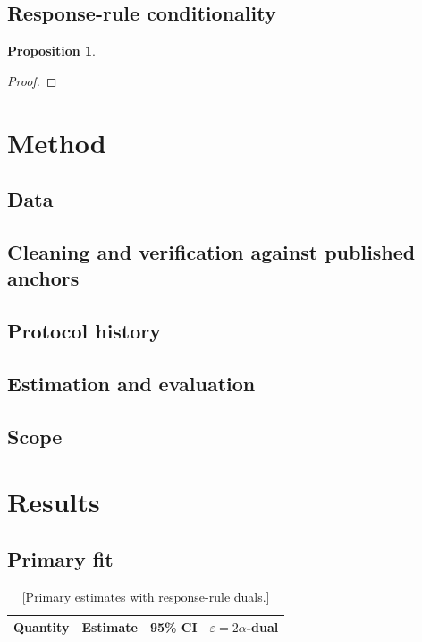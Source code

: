 \documentclass[11pt]{article}
\newtheorem{proposition}{Proposition}
\newcommand{\alphaw}{\ensuremath{\alpha}}                 %
\newcommand{\epsdual}[1]{\ensuremath{\varepsilon = 2#1}}  %
\newcommand{\dalpha}{\ensuremath{\Delta\alpha}}           %
\begin{document}
\subsection{Response-rule conditionality}\label{sec:equivalence}
\begin{proposition}\label{prop:equivalence}
\end{proposition}
\begin{proof}
\end{proof}

\section{Method}\label{sec:method}
\subsection{Data}\label{sec:data}
\subsection{Cleaning and verification against published anchors}\label{sec:cleaning}
\subsection{Protocol history}\label{sec:protocol}
\subsection{Estimation and evaluation}\label{sec:estimation}
\subsection{Scope}\label{sec:scope}

\section{Results}\label{sec:results}
\subsection{Primary fit}\label{sec:fit}

\begin{table}[tb]
  \centering
  \caption{[Primary estimates with response-rule duals.]}
  \label{tab:main}
  \begin{tabular}{lccc}
    \toprule
    Quantity & Estimate & 95\% CI & \epsdual{\alphaw}-dual \\
    \midrule
    \bottomrule
  \end{tabular}
\end{table}
\end{document}
